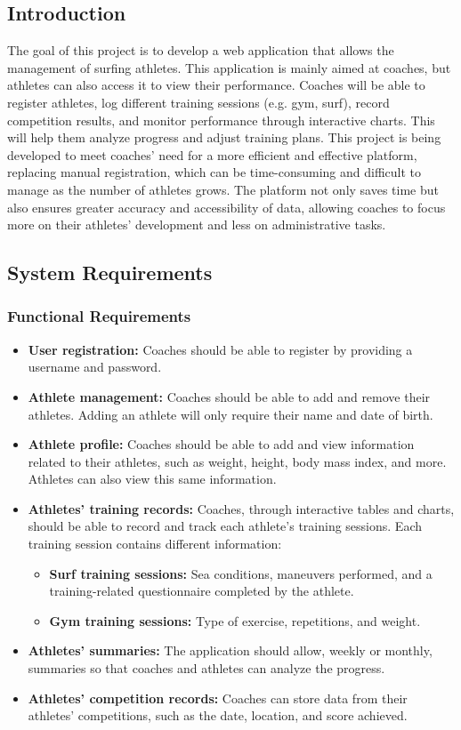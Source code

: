 \documentclass[a4paper,twoside,11pt]{article}
\begin{document}
\subsection{Introduction}
The goal of this project is to develop a web application that allows the management of surfing athletes. This application is mainly aimed at coaches, but athletes can also access it to view their performance. Coaches will be able to register athletes, log different training sessions (e.g. gym, surf), record competition results, and monitor
performance through interactive charts. This will help them analyze progress and adjust training plans. This project is being developed to meet coaches' need for a more efficient and effective platform, replacing manual registration, which can be time-consuming and difficult to manage as the number of athletes grows. The platform not only saves time but also ensures greater accuracy and accessibility of data, allowing coaches to focus more on their athletes’ development and less on administrative tasks.

\subsection{System Requirements}

\subsubsection{Functional Requirements}
\begin{itemize}
\item \textbf{User registration:} Coaches should be able to register by providing a username and password.
\item \textbf{Athlete management:} Coaches should be able to add and remove their athletes. Adding an athlete will only require their name and date of birth.
\item \textbf{Athlete profile:} Coaches should be able to add and view information related to their athletes, such as weight, height, body mass index, and more. Athletes can also view this same information.
\item \textbf{Athletes' training records:} Coaches, through interactive tables and charts, should be able to record and track each athlete's training sessions. Each training session contains different information:
\begin{itemize}
\item \textbf{Surf training sessions:} Sea conditions, maneuvers performed, and a training-related questionnaire completed by the athlete.
\item \textbf{Gym training sessions:} Type of exercise, repetitions, and weight.
\end{itemize}
\item \textbf{Athletes' summaries:} The application should allow, weekly or monthly, summaries so that coaches and athletes can analyze the progress.
\item \textbf{Athletes' competition records:} Coaches can store data from their athletes' competitions, such as the date, location, and score achieved.
\end{itemize}
\end{document}
